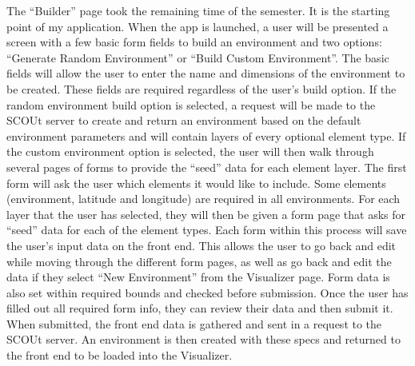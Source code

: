 \documentclass[]{report}
\begin{document}
The “Builder” page took the remaining time of the semester.
It is the starting point of my application.
When the app is launched, a user will be presented a screen with a few basic form fields to build an environment and two options: “Generate Random Environment” or “Build Custom Environment”.
The basic fields will allow the user to enter the name and dimensions of the environment to be created.
These fields are required regardless of the user’s build option.
If the random environment build option is selected, a request will be made to the SCOUt server to create and return an environment based on the default environment parameters and will contain layers of every optional element type.
If the custom environment option is selected, the user will then walk through several pages of forms to provide the “seed” data for each element layer.
The first form will ask the user which elements it would like to include.
Some elements (environment, latitude and longitude) are required in all environments.
For each layer that the user has selected, they will then be given a form page that asks for “seed” data for each of the element types.
Each form within this process will save the user’s input data on the front end.
This allows the user to go back and edit while moving through the different form pages, as well as go back and edit the data if they select “New Environment” from the Visualizer page.
Form data is also set within required bounds and checked before submission.
Once the user has filled out all required form info, they can review their data and then submit it.
When submitted, the front end data is gathered and sent in a request to the SCOUt server.
An environment is then created with these specs and returned to the front end to be loaded into the Visualizer.
\end{document}
